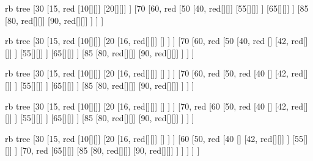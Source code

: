 


\begin{page}
	\begin{forest} rb tree
		[30
			[15, red
				[10[][]]
				[20[][]]
			]
			[70
				[60, red
					[50
						[40, red[][]]
						[55[][]]
					]
					[65[][]]
				]
				[85
					[80, red[][]]
					[90, red[][]]
				]
			]
		]
	\end{forest}
\end{page}

\begin{page}
	\begin{forest} rb tree
		[30
			[15, red
				[10[][]]
				[20
					[16, red[][]]
					[]
				]
			]
			[70
				[60, red
					[50
						[40, red
							[]
							[42, red[][]]
						]
						[55[][]]
					]
					[65[][]]
				]
				[85
					[80, red[][]]
					[90, red[][]]
				]
			]
		]
	\end{forest}
\end{page}

\begin{page}
	\begin{forest} rb tree
		[30
			[15, red
				[10[][]]
				[20
					[16, red[][]]
					[]
				]
			]
			[70
				[60, red
					[50, red
						[40
							[]
							[42, red[][]]
						]
						[55[][]]
					]
					[65[][]]
				]
				[85
					[80, red[][]]
					[90, red[][]]
				]
			]
		]
	\end{forest}
\end{page}

\begin{page}
	\begin{forest} rb tree
		[30
			[15, red
				[10[][]]
				[20
					[16, red[][]]
					[]
				]
			]
			[70, red
				[60
					[50, red
						[40
							[]
							[42, red[][]]
						]
						[55[][]]
					]
					[65[][]]
				]
				[85
					[80, red[][]]
					[90, red[][]]
				]
			]
		]
	\end{forest}
\end{page}

\begin{page}
	\begin{forest} rb tree
		[30
			[15, red
				[10[][]]
				[20
					[16, red[][]]
					[]
				]
			]
			[60
					[50, red
						[40
							[]
							[42, red[][]]
						]
						[55[][]]
					]
					[70, red
						[65[][]]
						[85
							[80, red[][]]
							[90, red[][]]
						]
					]
				]
			]
		]
	\end{forest}
\end{page}


